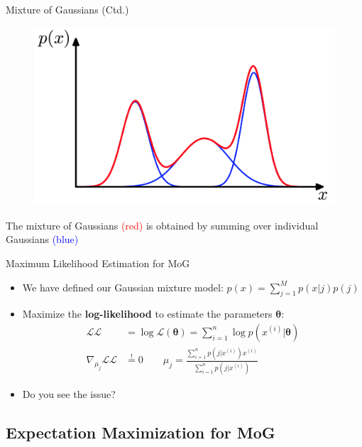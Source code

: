 \begin{frame}{Mixture of Gaussians (Ctd.)}{}
	\begin{figure}
		\centering
		\includegraphics[scale=0.4]{04_density_estimation/02_img/gaussian_mixture}
	\end{figure}
	\footnotesize The mixture of Gaussians \textcolor{red}{(red)} is obtained by summing over individual Gaussians \textcolor{blue}{(blue)}
\end{frame}


\begin{frame}{Maximum Likelihood Estimation for MoG}{}
	\begin{itemize}
		\item We have defined our Gaussian mixture model: $p(x) = \sum_{j=1}^M p(x \vert j) p(j)$
		\item Maximize the \textbf{log-likelihood} to estimate the parameters $\bm{\theta}$:
		\begin{align}
			\mathcal{L}\mathcal{L}
				&= \log \mathcal{L}(\bm{\theta}) = \sum_{i=1}^n \log p(x^{(i)} \vert \bm{\theta}) \\[3mm]
			\nabla_{\mu_j} \mathcal{L}\mathcal{L} &\overset{!}{=} 0
			\qquad
			\mu_j = \frac{\sum_{i=1}^n p(j \vert x^{(i)}) x^{(i)}}{\sum_{i=1}^n p(j \vert x^{(i)})}
		\end{align}
		\item Do you see the issue? 
	\end{itemize}
\end{frame}


\subsection{Expectation Maximization for MoG}

